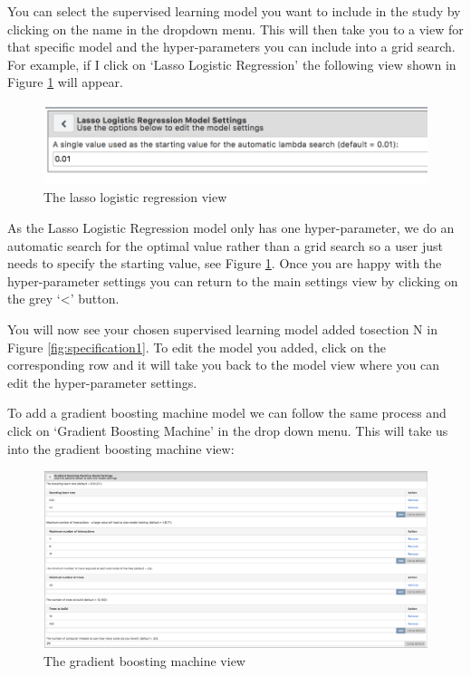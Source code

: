 \documentclass[11pt]{book}
\begin{document}
You can select the supervised learning model you want to include in the
study by clicking on the name in the dropdown menu. This will then take
you to a view for that specific model and the hyper-parameters you can
include into a grid search. For example, if I click on `Lasso Logistic
Regression' the following view shown in Figure \ref{fig:figureAS2} will
appear.

\begin{figure}
\includegraphics[width=1\linewidth]{images/PatientLevelPrediction/atlasImplementation/analysis_lasso_lr_view} \caption{The lasso logistic regression view}\label{fig:figureAS2}
\end{figure}

As the Lasso Logistic Regression model only has one hyper-parameter, we
do an automatic search for the optimal value rather than a grid search
so a user just needs to specify the starting value, see Figure
\ref{fig:figureAS2}. Once you are happy with the hyper-parameter
settings you can return to the main settings view by clicking on the
grey `\textless{}' button.

You will now see your chosen supervised learning model added tosection N
in Figure \ref{fig:specification1}. To edit the model you added, click
on the corresponding row and it will take you back to the model view
where you can edit the hyper-parameter settings.

To add a gradient boosting machine model we can follow the same process
and click on `Gradient Boosting Machine' in the drop down menu. This
will take us into the gradient boosting machine view:

\begin{figure}
\includegraphics[width=1\linewidth]{images/PatientLevelPrediction/atlasImplementation/analysis_gbm_view} \caption{The gradient boosting machine view}\label{fig:figureAS5}
\end{figure}
\end{document}

